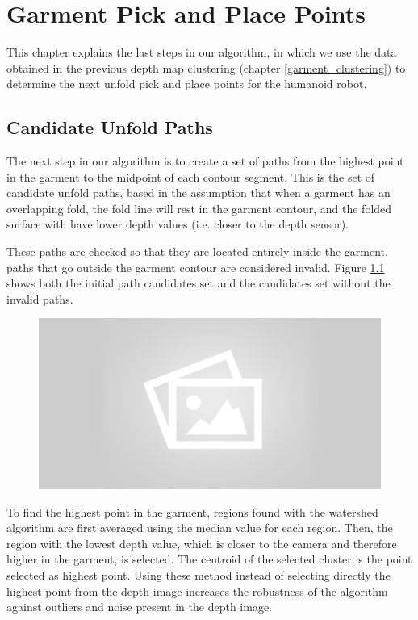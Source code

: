 \chapter{Garment Pick and Place Points}
\label{pick_and_place}
This chapter explains the last steps in our algorithm, in which we use the data obtained in the previous depth map clustering (chapter \ref{garment_clustering}) to determine the next unfold pick and place points for the humanoid robot.

\section{Candidate Unfold Paths}
\label{unfold_paths}

The next step in our algorithm is to create a set of paths from the highest point in the garment to the midpoint of each contour segment. This is the set of candidate unfold paths, based in the assumption that when a garment has an overlapping fold, the fold line will rest in the garment contour, and the folded surface with have lower depth values (i.e. closer to the depth sensor).

These paths are checked so that they are located entirely inside the garment, paths that go outside the garment contour are considered invalid. Figure \ref{fig:candidate_paths} shows both the initial path candidates set and the candidates set without the invalid paths.

\begin{figure}[thpb]
    \centering
    \includegraphics[width=0.7
    \textwidth]{figures/placeholder2.png}
    \caption{}
    \label{fig:candidate_paths}
\end{figure}


To find the highest point in the garment, regions found with the watershed algorithm are first averaged using the median value for each region. Then, the region with the lowest depth value, which is closer to the camera and therefore higher in the garment, is selected. The centroid of the selected cluster is the point selected as highest point. Using these method instead of selecting directly the highest point from the depth image increases the robustness of the algorithm against outliers and noise present in the depth image.


